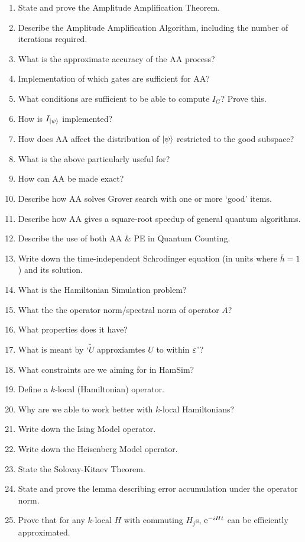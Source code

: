 \documentclass[]{article}
\begin{document}
\begin{enumerate}
    \item State and prove the Amplitude Amplification Theorem.
    \item Describe the Amplitude Amplification Algorithm, including the number of iterations required.
    \item What is the approximate accuracy of the AA process?
    \item Implementation of which gates are sufficient for AA?
    \item What conditions are sufficient to be able to compute $I_G$? Prove this.
    \item How is $I_{\lvert\psi\rangle}$ implemented?
    \item How does AA affect the distribution of $\lvert\psi\rangle$ restricted to the good subspace?
    \item What is the above particularly useful for?
    \item How can AA be made exact?
    \item Describe how AA solves Grover search with one or more `good' items.
    \item Describe how AA gives a square-root speedup of general quantum algorithms.
    \item Describe the use of both AA \& PE in Quantum Counting.
    \item Write down the time-independent Schrodinger equation (in units where $\bar{h} =1 $) and its solution.
    \item What is the Hamiltonian Simulation problem?
    \item What the the operator norm/spectral norm of operator $A$?
    \item What properties does it have?
    \item What is meant by `$\tilde{U}$ approxiamtes $U$ to within $\varepsilon$'?
    \item What constraints are we aiming for in HamSim?
    \item Define a $k$-local (Hamiltonian) operator.
    \item Why are we able to work better with $k$-local Hamiltonians?
    \item Write down the Ising Model operator.
    \item Write down the Heisenberg Model operator.
    \item State the Solovay-Kitaev Theorem.
    \item State and prove the lemma describing error accumulation under the operator norm.
    \item Prove that for any $k$-local $H$ with commuting $H_j$s, $\mathrm{e}^{-iHt}$ can be efficiently approximated.

\end{enumerate}
\end{document}
